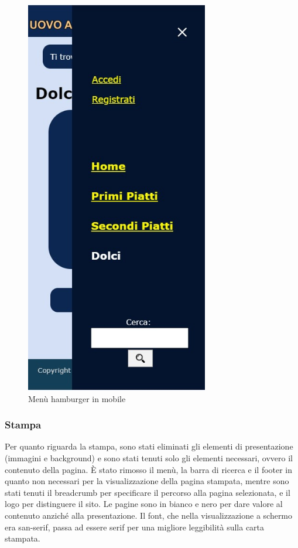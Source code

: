 \begin{figure}[H]
\begin{minipage}[b]{8.5cm}
		\centering
		\includegraphics[width=8cm]{img/progettazione/mobile-menu.jpg}
		\caption{Menù hamburger in mobile}
	\end{minipage}
\end{figure}


\subsubsection{Stampa}
\label{ssub:stampa}
Per quanto riguarda la stampa, sono stati eliminati gli elementi di presentazione (immagini e background) e sono stati tenuti solo gli elementi necessari, ovvero il contenuto della pagina. È stato rimosso il menù, la barra di ricerca e il footer in quanto non necessari per la visualizzazione della pagina stampata, mentre sono stati tenuti il breadcrumb per specificare il percorso alla pagina selezionata, e il logo per distinguere il sito.
Le pagine sono in bianco e nero per dare valore al contenuto anziché alla presentazione. Il font, che nella visualizzazione a schermo era san-serif, passa ad essere serif per una migliore leggibilità sulla carta stampata.


